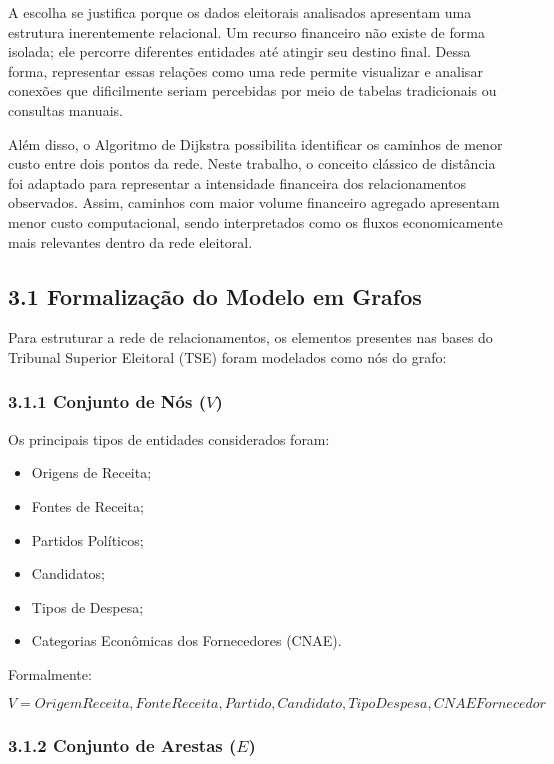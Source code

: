 \documentclass[11pt]{article}
\providecommand{\tightlist}{%
      \setlength{\itemsep}{0pt}\setlength{\parskip}{0pt}}
\begin{document}
A escolha se justifica porque os dados eleitorais analisados apresentam
uma estrutura inerentemente relacional. Um recurso financeiro não existe
de forma isolada; ele percorre diferentes entidades até atingir seu
destino final. Dessa forma, representar essas relações como uma rede
permite visualizar e analisar conexões que dificilmente seriam
percebidas por meio de tabelas tradicionais ou consultas manuais.

Além disso, o Algoritmo de Dijkstra possibilita identificar os caminhos
de menor custo entre dois pontos da rede. Neste trabalho, o conceito
clássico de distância foi adaptado para representar a intensidade
financeira dos relacionamentos observados. Assim, caminhos com maior
volume financeiro agregado apresentam menor custo computacional, sendo
interpretados como os fluxos economicamente mais relevantes dentro da
rede eleitoral.

\subsection{3.1 Formalização do Modelo em
Grafos}\label{formalizauxe7uxe3o-do-modelo-em-grafos}

Para estruturar a rede de relacionamentos, os elementos presentes nas
bases do Tribunal Superior Eleitoral (TSE) foram modelados como nós do
grafo:

\subsubsection{\texorpdfstring{3.1.1 Conjunto de Nós
(\(V\))}{3.1.1 Conjunto de Nós (V)}}\label{conjunto-de-nuxf3s-v}

Os principais tipos de entidades considerados foram:

\begin{itemize}
\tightlist
\item
  Origens de Receita;
\item
  Fontes de Receita;
\item
  Partidos Políticos;
\item
  Candidatos;
\item
  Tipos de Despesa;
\item
  Categorias Econômicas dos Fornecedores (CNAE).
\end{itemize}

Formalmente:

\[
V = {OrigemReceita, FonteReceita, Partido, Candidato, TipoDespesa, CNAEFornecedor}
\]

\subsubsection{\texorpdfstring{3.1.2 Conjunto de Arestas
(\(E\))}{3.1.2 Conjunto de Arestas (E)}}\label{conjunto-de-arestas-e}
\end{document}

